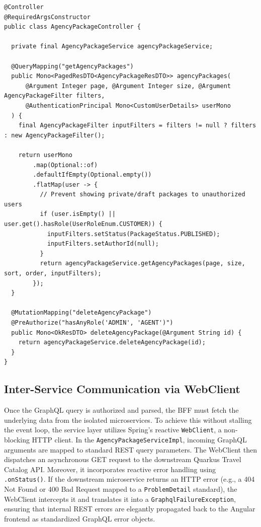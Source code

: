 \begin{lstlisting}[language=JavaExtended, caption={Context-Aware GraphQL Controller}, label={lst:bff_controller}]
@Controller
@RequiredArgsConstructor
public class AgencyPackageController {

  private final AgencyPackageService agencyPackageService;

  @QueryMapping("getAgencyPackages")
  public Mono<PagedResDTO<AgencyPackageResDTO>> agencyPackages(
      @Argument Integer page, @Argument Integer size, @Argument AgencyPackageFilter filters,
      @AuthenticationPrincipal Mono<CustomUserDetails> userMono
  ) {
    final AgencyPackageFilter inputFilters = filters != null ? filters : new AgencyPackageFilter();

    return userMono
        .map(Optional::of)
        .defaultIfEmpty(Optional.empty())
        .flatMap(user -> {
          // Prevent showing private/draft packages to unauthorized users
          if (user.isEmpty() || user.get().hasRole(UserRoleEnum.CUSTOMER)) {
            inputFilters.setStatus(PackageStatus.PUBLISHED);
            inputFilters.setAuthorId(null);
          }
          return agencyPackageService.getAgencyPackages(page, size, sort, order, inputFilters);
        });
  }

  @MutationMapping("deleteAgencyPackage")
  @PreAuthorize("hasAnyRole('ADMIN', 'AGENT')")
  public Mono<OkResDTO> deleteAgencyPackage(@Argument String id) {
    return agencyPackageService.deleteAgencyPackage(id);
  }
}
\end{lstlisting}

\subsection{Inter-Service Communication via WebClient}

Once the GraphQL query is authorized and parsed, the BFF must fetch the underlying data from the isolated microservices. To achieve this without stalling the event loop, the service layer utilizes Spring's reactive \texttt{WebClient}, a non-blocking HTTP client. In the \texttt{AgencyPackageServiceImpl}, incoming GraphQL arguments are mapped to standard REST query parameters. The WebClient then dispatches an asynchronous GET request to the downstream Quarkus Travel Catalog API. Moreover, it incorporates reactive error handling using \texttt{.onStatus()}. If the downstream microservice returns an HTTP error (e.g., a 404 Not Found or 400 Bad Request mapped to a \texttt{ProblemDetail} standard), the WebClient intercepts it and translates it into a \texttt{GraphqlFailureException}, ensuring that internal REST errors are elegantly propagated back to the Angular frontend as standardized GraphQL error objects.

